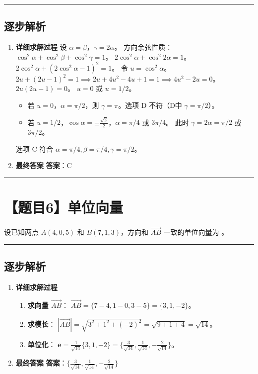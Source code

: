 \documentclass[UTF8]{ctexart}
\newenvironment{redenv}{\color{red}}{}
\newenvironment{detailedanalysis}{%
    \color{red}
    \begin{enumerate}[label=\textbf{第\arabic*步：}, leftmargin=*, align=left, itemsep=1.5ex]
}{%
    \end{enumerate}
}
\newcommand{\problemrule}{\noindent\rule{\textwidth}{1.5pt}\vspace{-0.8em}}
\newcommand{\analysisrule}{\noindent\rule{\textwidth}{0.8pt}\vspace{-0.8em}}
\newcommand{\blank}[1]{\underline{\hspace{#1}}}
\begin{document}
\begin{redenv}
\analysisrule
\subsection*{逐步解析}

\begin{detailedanalysis}
\item \textbf{详细求解过程}
设 $\alpha = \beta$，$\gamma = 2\alpha$。
方向余弦性质：$\cos^2 \alpha + \cos^2 \beta + \cos^2 \gamma = 1$。
$2\cos^2 \alpha + \cos^2 2\alpha = 1$。
$2\cos^2 \alpha + (2\cos^2 \alpha - 1)^2 = 1$。
令 $u = \cos^2 \alpha$。
$2u + (2u-1)^2 = 1 \implies 2u + 4u^2 - 4u + 1 = 1 \implies 4u^2 - 2u = 0$。
$2u(2u-1) = 0$。
$u=0$ 或 $u=1/2$。
\begin{itemize}
    \item 若 $u=0$，$\alpha = \pi/2$，则 $\gamma = \pi$。选项 D 不符（D中 $\gamma=\pi/2$）。
    \item 若 $u=1/2$，$\cos \alpha = \pm \frac{\sqrt{2}}{2}$，$\alpha = \pi/4$ 或 $3\pi/4$。
    此时 $\gamma = 2\alpha = \pi/2$ 或 $3\pi/2$。
\end{itemize}
选项 C 符合 $\alpha=\pi/4, \beta=\pi/4, \gamma=\pi/2$。

\item \textbf{最终答案}
\textbf{答案}：C
\end{detailedanalysis}
\end{redenv}

\problemrule
\section*{【题目6】单位向量}
设已知两点 $A(4,0,5)$ 和 $B(7,1,3)$，方向和 $ \overrightarrow{AB} $ 一致的单位向量为 \blank{2cm}。

\begin{redenv}
\analysisrule
\subsection*{逐步解析}

\begin{detailedanalysis}
\item \textbf{详细求解过程}
\begin{enumerate}[label=(\arabic*)]
\item \textbf{求向量 $\overrightarrow{AB}$}：
$\overrightarrow{AB} = \{7-4, 1-0, 3-5\} = \{3, 1, -2\}$。
\item \textbf{求模长}：
$|\overrightarrow{AB}| = \sqrt{3^2 + 1^2 + (-2)^2} = \sqrt{9+1+4} = \sqrt{14}$。
\item \textbf{单位化}：
$\mathbf{e} = \frac{1}{\sqrt{14}} \{3, 1, -2\} = \{\frac{3}{\sqrt{14}}, \frac{1}{\sqrt{14}}, -\frac{2}{\sqrt{14}}\}$。
\end{enumerate}

\item \textbf{最终答案}
\textbf{答案}：$ \{\frac{3}{\sqrt{14}}, \frac{1}{\sqrt{14}}, -\frac{2}{\sqrt{14}}\} $
\end{detailedanalysis}
\end{redenv}
\end{document}
